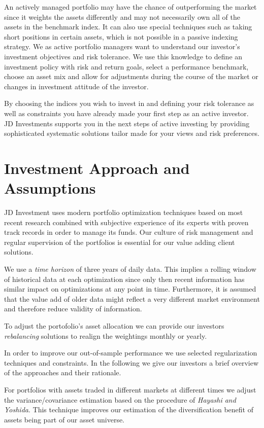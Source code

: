 \documentclass[11pt, parskip=full, DIV=14]{scrreprt}
\begin{document}
An actively managed portfolio may have the chance of outperforming the market since it weights the assets differently and may not necessarily own all of the assets in the benchmark index.
It can also use special techniques such as taking short positions in certain assets, which is not possible in a passive indexing strategy.
We as active portfolio managers want to understand our investor’s investment objectives and risk tolerance.
We use this knowledge to define an investment policy with risk and return goals, select a performance benchmark, choose an asset mix and allow for adjustments during the course of the market or changes in investment attitude of the investor.

By choosing the indices you wish to invest in and defining your risk tolerance as well as constraints you have already made your first step as an active investor.
JD Investments supports you in the next steps of active investing by providing sophisticated systematic solutions tailor made for your views and risk preferences.

 
\section*{Investment Approach and Assumptions}
JD Investment uses modern portfolio optimization techniques based on most recent research combined with subjective experience of its experts with proven track records in order to manage its funds.
Our culture of risk management and regular supervision of the portfolios is essential for our value adding client solutions.

We use a \textit{time horizon} of three years of daily data.
This implies a rolling window of historical data at each optimization since only then recent information has similar impact on optimizations at any point in time.
Furthermore, it is assumed that the value add of older data might reflect a very different market environment and therefore reduce validity of information.

 To adjust the portofolio’s asset allocation we can provide our investors \textit{rebalancing} solutions to realign the weightings monthly or yearly.

In order to improve our out-of-sample performance we use selected regularization techniques and constraints.
In the following we give our investors a brief overview of the approaches and their rationale.
 
For portfolios with assets traded in different markets at different times we adjust the variance/covariance estimation based on the procedure of \textit{Hayashi and Yoshida}.
This technique improves our estimation of the diversification benefit of assets being part of our asset universe.
\end{document}
